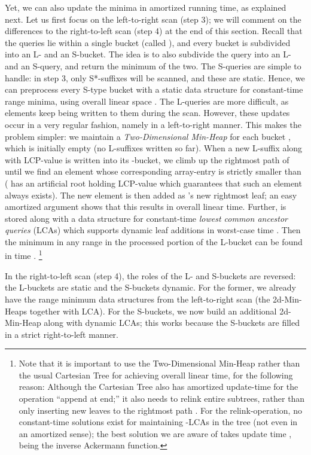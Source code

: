 \documentclass[11pt,onecolumn,final]{article} \usepackage[latin1]{inputenc}
\theoremstyle{plain}
\theoremstyle{remark}
\begin{document}
Yet, we can also update the minima in  amortized running time, as explained next. Let us first focus on the left-to-right scan (step 3); we will comment on the differences to the right-to-left scan (step 4) at the end of this section. Recall that the queries lie within a single bucket (called ), and every bucket is subdivided into an L- and an S-bucket. The idea is to also subdivide the query into an L- and an S-query, and return the minimum of the two. The S-queries are simple to handle: in step 3, only S*-suffixes will be scanned, and these are static. Hence, we can preprocess every S-type bucket with a static data structure for constant-time range minima, using overall linear space \cite[Thm.~1]{fischer10optimal}. The L-queries are more difficult, as elements keep being written to them during the scan. However, these updates occur in a very regular fashion, namely in a left-to-right manner. This makes the problem simpler: we maintain a \emph{Two-Dimensional Min-Heap} \cite[Def.~2]{fischer10optimal}  for each bucket , which is initially empty (no L-suffixes written so far). When a new L-suffix along with LCP-value  is written into its -bucket, we climb up the rightmost path of  until we find an element  whose corresponding array-entry is strictly smaller than  ( has an artificial root holding LCP-value  which guarantees that such an element always exists). The new element is then added as 's new rightmost leaf; an easy amortized argument shows that this results in overall linear time. Further,  is stored along with a data structure for constant-time \emph{lowest common ancestor queries} (LCAs) which supports dynamic leaf additions in  worst-case time \cite{cole05dynamic}. Then the minimum in any range in the processed portion of the L-bucket can be found in  time \cite[Lemma~2]{fischer10optimal}. \footnote{Note that it is important to use the Two-Dimensional Min-Heap rather than the usual Cartesian Tree for achieving overall linear time, for the following reason: Although the Cartesian Tree also has  amortized update-time for the operation ``append at end;'' it also needs to relink entire subtrees, rather than only inserting new leaves to the rightmost path \cite{gabow84scaling}. For the relink-operation, no constant-time solutions exist for maintaining -LCAs in the tree (not even in an amortized sense); the best solution we are aware of takes  update time \cite{harel84fast},  being the inverse Ackermann function.}

In the right-to-left scan (step 4), the roles of the L- and S-buckets are reversed: the L-buckets are static and the S-buckets dynamic. For the former, we already have the range minimum data structures from the left-to-right scan (the 2d-Min-Heaps together with LCA). For the S-buckets, we now build an additional 2d-Min-Heap along with dynamic LCAs; this works because the S-buckets are filled in a strict right-to-left manner.
\end{document}
